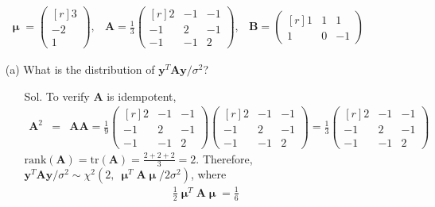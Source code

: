 \documentclass[12pt]{article} %
\begin{document}
\begin{enumerate}
\begin{eqnarray*}
 	   \mathbf{\upmu}=
		\begin{pmatrix}[r]
		 3 \\
	        -2 \\
		 1 
		\end{pmatrix},
		&
	       \mathbf{A}=\frac{1}{3}
	       \begin{pmatrix}[r]
		 2  & -1 & -1 \\
 		 -1 &  2 & -1  \\
		 -1 & -1 & 2 
	       \end{pmatrix},		   
	      &
              \mathbf{B}=
             \begin{pmatrix}[r]
    	       1  & 1 & 1 \\
               1 &  0 & -1 
	     \end{pmatrix}	
       \end{eqnarray*}
	\begin{enumerate}
	  \item[(a)] What is the distribution of $\mathbf{y}^{T}\mathbf{A}\mathbf{y}/\sigma^{2}$?
		\begin{enumerate}
		   \item[Sol.] To verify $\mathbf{A}$ is idempotent, 
		   \begin{eqnarray*}
			\mathbf{A}^{2}&=&\mathbf{AA}=\frac{1}{9}
	   	       \begin{pmatrix}[r]
			 2  & -1 & -1 \\
	 		 -1 &  2 & -1  \\
			 -1 & -1 & 2 
		       \end{pmatrix}
	   	       \begin{pmatrix}[r]
			 2  & -1 & -1 \\
	 		 -1 &  2 & -1  \\
			 -1 & -1 & 2 
		       \end{pmatrix}=\frac{1}{3}
	   	       \begin{pmatrix}[r]
			 2  & -1 & -1 \\
	 		 -1 &  2 & -1  \\
			 -1 & -1 & 2 
			\end{pmatrix}			
		   \end{eqnarray*}					
		   $\mathrm{rank}(\mathbf{A})=\mathrm{tr}(\mathbf{A})=\frac{2+2+2}{3}=2$. 
                  Therefore, $\mathbf{y}^{T}\mathbf{A}\mathbf{y}/\sigma^{2}
			\sim \chi^{2}(2, ~\mathbf{\upmu}^{T}\mathbf{A}\mathbf{\upmu}/{2\sigma^2})$,
		  where 
		  \begin{eqnarray*}	
		  \frac{1}{2}\mathbf{\upmu}^{T}\mathbf{A}\mathbf{\upmu}=\frac{1}{6}

\end{eqnarray*}
\end{enumerate}
\end{enumerate}
\end{enumerate}
\end{document}
